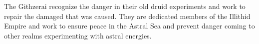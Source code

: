The Githzerai recognize the danger in their old druid experiments and work to repair the damaged that was caused.
They are dedicated members of the Illithid Empire and work to ensure peace in the Astral Sea and prevent danger coming to other realms experimenting with astral energies.
